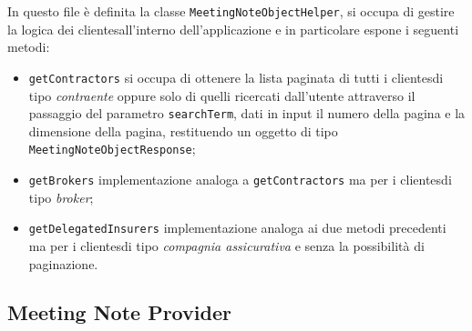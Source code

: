 In questo file è definita la classe \lstinline{MeetingNoteObjectHelper}, si occupa di gestire la logica dei \glspl{cliente}\glsoccur all'interno dell'applicazione e in particolare espone i seguenti metodi:
\begin{itemize}
    \item \lstinline{getContractors} si occupa di ottenere la lista paginata di tutti i \glspl{cliente}\glsoccur di tipo \emph{contraente} oppure solo di quelli ricercati dall'utente attraverso il passaggio del parametro \lstinline{searchTerm}, dati in input il numero della pagina e la dimensione della pagina, restituendo un oggetto di tipo \lstinline{MeetingNoteObjectResponse};
    \item \lstinline{getBrokers} implementazione analoga a \lstinline{getContractors} ma per i \glspl{cliente}\glsoccur di tipo \emph{broker};
    \item \lstinline{getDelegatedInsurers} implementazione analoga ai due metodi precedenti ma per i \glspl{cliente}\glsoccur di tipo \emph{compagnia assicurativa} e senza la possibilità di paginazione.
\end{itemize}

\subsection{Meeting Note Provider}
\label{subsec:meeting-note-provider}

